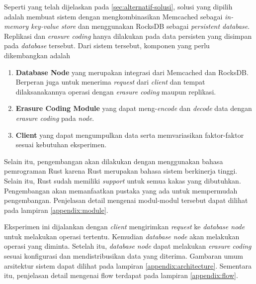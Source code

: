 
Seperti yang telah dijelaskan pada \ref{sec:alternatif-solusi}, solusi yang dipilih adalah membuat sistem dengan mengkombinasikan Memcached sebagai \textit{in-memory key-value store} dan menggunakan RocksDB sebagai \textit{persistent database}. Replikasi dan \textit{erasure coding} hanya dilakukan pada data persisten yang disimpan pada \textit{database} tersebut. Dari sistem tersebut, komponen yang perlu dikembangkan adalah
\begin{enumerate}
  \item \textbf{Database Node} yang merupakan integrasi dari Memcached dan RocksDB. Berperan juga untuk menerima \textit{request} dari \textit{client} dan tempat dilaksanakannya operasi dengan \textit{erasure coding} maupun replikasi.
  \item \textbf{Erasure Coding Module} yang dapat meng-\textit{encode} dan \textit{decode} data dengan \textit{erasure coding} pada \textit{node}.
  \item \textbf{Client} yang dapat mengumpulkan data serta memvariasikan faktor-faktor sesuai kebutuhan eksperimen.
\end{enumerate}

Selain itu, pengembangan akan dilakukan dengan menggunakan bahasa pemrograman Rust karena Rust merupakan bahasa sistem berkinerja tinggi. Selain itu, Rust sudah memiliki \textit{support} untuk semua kakas yang dibutuhkan. Pengembangan akan memanfaatkan pustaka yang ada untuk mempermudah pengembangan. Penjelasan detail mengenai modul-modul tersebut dapat dilihat pada lampiran \ref{appendix:module}.

Eksperimen ini dijalankan dengan \textit{client} mengirimkan \textit{request} ke \textit{database node} untuk melakukan operasi tertentu. Kemudian \textit{database node} akan melakukan operasi yang diminta. Setelah itu, \textit{database node} dapat melakukan \textit{erasure coding} sesuai konfigurasi dan mendistribusikan data yang diterima. Gambaran umum arsitektur sistem dapat dilihat pada lampiran \ref{appendix:architecture}. Sementara itu, penjelasan detail mengenai flow terdapat pada lampiran \ref{appendix:flow}.
  